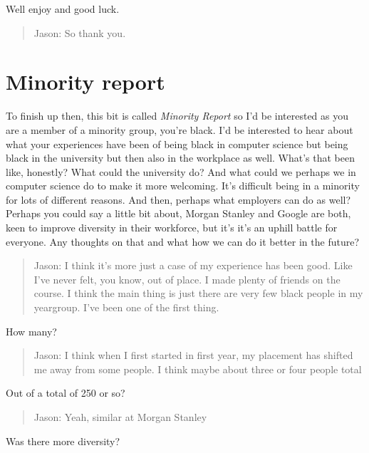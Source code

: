 \documentclass[
]{book}
\begin{document}
Well enjoy and good luck.

\begin{quote}
Jason: So thank you.
\end{quote}

\hypertarget{jminority}{%
\section{Minority report}\label{jminority}}

To finish up then, this bit is called \emph{Minority Report} so I'd be interested as you are a member of a minority group, you're black. I'd be interested to hear about what your experiences have been of being black in computer science but being black in the university but then also in the workplace as well. What's that been like, honestly? What could the university do? And what could we perhaps we in computer science do to make it more welcoming. It's difficult being in a minority for lots of different reasons. And then, perhaps what employers can do as well? Perhaps you could say a little bit about, Morgan Stanley and Google are both, keen to improve diversity in their workforce, but it's it's an uphill battle for everyone. Any thoughts on that and what how we can do it better in the future?

\begin{quote}
Jason: I think it's more just a case of my experience has been good. Like I've never felt, you know, out of place. I made plenty of friends on the course. I think the main thing is just there are very few black people in my yeargroup. I've been one of the first thing.
\end{quote}

How many?

\begin{quote}
Jason: I think when I first started in first year, my placement has shifted me away from some people. I think maybe about three or four people total
\end{quote}

Out of a total of 250 or so?

\begin{quote}
Jason: Yeah, similar at Morgan Stanley
\end{quote}

Was there more diversity?
\end{document}
